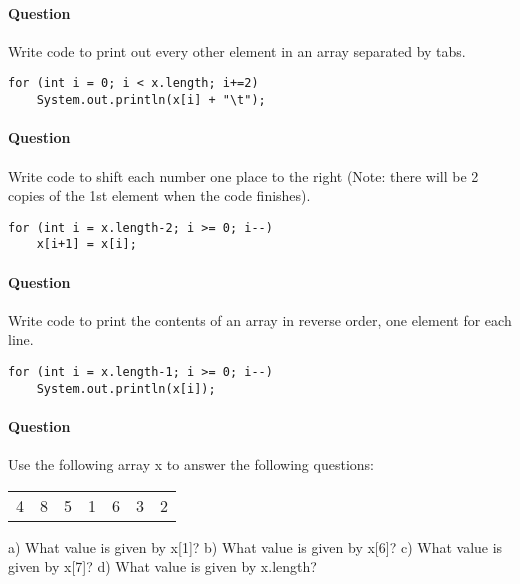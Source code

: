 \documentclass{article}
\begin{document}
\addtocounter{question_num}{1}
\paragraph{Question }
Write code to print out every other element in an array separated by tabs.
\begin{lstlisting}
for (int i = 0; i < x.length; i+=2)
	System.out.println(x[i] + "\t");
\end{lstlisting}

\addtocounter{question_num}{1}
\paragraph{Question }
Write code to shift each number one place to the right (Note: there will be 2 copies of the 1st element when the code finishes).
\begin{lstlisting}
for (int i = x.length-2; i >= 0; i--)
	x[i+1] = x[i];
\end{lstlisting}

\addtocounter{question_num}{1}
\paragraph{Question }
Write code to print the contents of an array in reverse order, one element for each line.
\begin{lstlisting}
for (int i = x.length-1; i >= 0; i--)
	System.out.println(x[i]);
\end{lstlisting}

\addtocounter{question_num}{1}
\paragraph{Question }
Use the following array x to answer the following questions:
\begin{table}[h]
\begin{tabular}{lllllll}
4 & 8 & 5 & 1 & 6 & 3 & 2
\end{tabular}
\end{table}
\newline
a) What value is given by x[1]?
\newline b) What value is given by x[6]?
\newline c) What value is given by x[7]?
\newline d) What value is given by x.length?
\end{document}
